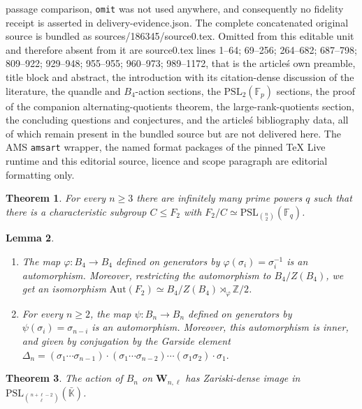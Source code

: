 \documentclass[10pt,a4paper]{amsart}
\newtheorem{theorem}{Theorem}[section]
\newtheorem{lemma}[theorem]{Lemma}
\begin{document}
passage comparison, \texttt{omit} was not used anywhere, and consequently no fidelity receipt is asserted in delivery-evidence.json. The complete concatenated original source is bundled as sources/186345/source0.tex. Omitted from this editable unit and therefore absent from it are source0.tex lines 1--64; 69--256; 264--682; 687--798; 809--922; 929--948; 955--955; 960--973; 989--1172, that is the article\'s own preamble, title block and abstract, the introduction with its citation-dense discussion of the literature, the quandle and $B_4$-action sections, the $\mathrm{PSL}_2(\mathbb{F}_p)$ sections, the proof of the companion alternating-quotients theorem, the large-rank-quotients section, the concluding questions and conjectures, and the article\'s bibliography data, all of which remain present in the bundled source but are not delivered here. The AMS \texttt{amsart} wrapper, the named format packages of the pinned TeX Live runtime and this editorial source, licence and scope paragraph are editorial formatting only.\par\smallskip
\setcounter{section}{1}
\setcounter{equation}{0}
\setcounter{theorem}{1}
\begin{theorem}
\label{Large rank quotients}
    For every $n \geq 3$ there are infinitely many prime powers $q$ such that there is a characteristic subgroup $C \leq F_2$ with $F_2 / C \simeq \mathrm{PSL}_{\binom{n}{2}}(\mathbb{F}_q)$.
\end{theorem}

\setcounter{section}{3}
\setcounter{equation}{1}
\setcounter{theorem}{4}
\begin{lemma}
\label{semi-direct product AutF2}
\begin{enumerate}
\item The map $\varphi: B_4 \to B_4$ defined on generators by $\varphi(\sigma_i) = \sigma_i^{-1}$ is an automorphism. Moreover, restricting the automorphism to $B_4/Z(B_4)$, we get an isomorphism $\mathrm{Aut}(F_2) \simeq B_4/Z(B_4) \rtimes_\varphi \mathbb{Z}/2$.
\item For every $n \geq 2$, the map $\psi: B_n \to B_n$ defined on generators by $\psi(\sigma_i) = \sigma_{n-i}$ is an automorphism. Moreover, this automorphism is inner, and given by conjugation by the Garside element $\Delta_n = (\sigma_1 \cdots \sigma_{n-1}) \cdot (\sigma_1 \cdots \sigma_{n-2}) \cdots (\sigma_1\sigma_2) \cdot \sigma_1.$
\end{enumerate}
\end{lemma}

\setcounter{section}{7}
\setcounter{equation}{0}
\setcounter{theorem}{1}
\begin{theorem}
\label{Knizhinik Zamolodichikov Zariski density}
    The action of $B_n$ on $\textbf{W}_{n,\ell}$ has Zariski-dense image in $\mathrm{PSL}_{\binom{n + \ell - 2}{\ell}}(\bar{\mathbb{K}})$.
\end{theorem}
\end{document}
